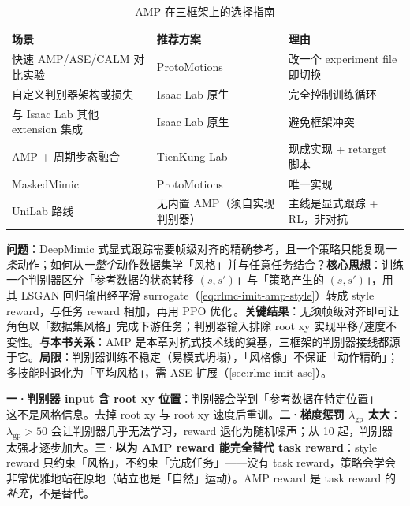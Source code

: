 \begin{table}[ht]
\centering
\small
\caption{AMP 在三框架上的选择指南}
\label{tab:rlmc-imit-amp-fw}
\begin{tabular}{@{}lll@{}}
\toprule
场景 & 推荐方案 & 理由 \\
\midrule
快速 AMP/ASE/CALM 对比实验 & ProtoMotions & 改一个 experiment file 即切换 \\
自定义判别器架构或损失 & Isaac Lab 原生 & 完全控制训练循环 \\
与 Isaac Lab 其他 extension 集成 & Isaac Lab 原生 & 避免框架冲突 \\
AMP + 周期步态融合 & TienKung-Lab & 现成实现 + retarget 脚本 \\
MaskedMimic & ProtoMotions & 唯一实现 \\
UniLab 路线 & 无内置 AMP（须自实现判别器） & 主线是显式跟踪 + RL，非对抗 \\
\bottomrule
\end{tabular}
\end{table}

\begin{paper}\label{paper:rlmc-imit-amp}
\textbf{问题}：DeepMimic 式显式跟踪需要帧级对齐的精确参考，且一个策略只能复现\emph{一条}动作；如何从\emph{一整个}动作数据集学「风格」并与任意任务结合？\textbf{核心思想}：训练一个判别器区分「参考数据的状态转移 $(s,s')$」与「策略产生的 $(s,s')$」，用其 LSGAN 回归输出经平滑 surrogate（\cref{eq:rlmc-imit-amp-style}）转成 style reward，与任务 reward 相加，再用 PPO 优化\,\cite{peng2021amp}。\textbf{关键结果}：无须帧级对齐即可让角色以「数据集风格」完成下游任务；判别器输入排除 root xy 实现平移/速度不变性。\textbf{与本书关系}：AMP 是本章对抗式技术线的奠基，三框架的判别器接线都源于它。\textbf{局限}：判别器训练不稳定（易模式坍塌），「风格像」不保证「动作精确」；多技能时退化为「平均风格」，需 ASE 扩展（\cref{sec:rlmc-imit-ase}）。
\end{paper}

\begin{pitfall}
\textbf{一·判别器 input 含 root xy 位置}：判别器会学到「参考数据在特定位置」——这不是风格信息。去掉 root xy 与 root xy 速度后重训。\textbf{二·梯度惩罚 $\lambda_{\text{gp}}$ 太大}：$\lambda_{\text{gp}}>50$ 会让判别器几乎无法学习，reward 退化为随机噪声；从 10 起，判别器太强才逐步加大。\textbf{三·以为 AMP reward 能完全替代 task reward}：style reward 只约束「风格」，不约束「完成任务」——没有 task reward，策略会学会非常优雅地站在原地（站立也是「自然」运动）。AMP reward 是 task reward 的\emph{补充}，不是替代。
\end{pitfall}


